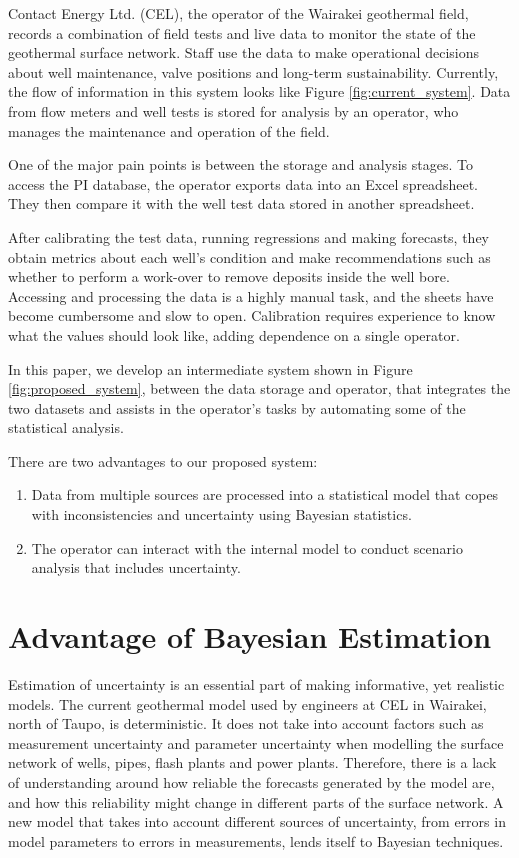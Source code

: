 \documentclass[a4paper, 12pt]{article}
\begin{document}
Contact Energy Ltd. (CEL), the operator of the Wairakei geothermal field, records a combination of field tests and live data to monitor the state of the geothermal surface network. Staff use the data to make operational decisions about well maintenance, valve positions and long-term sustainability. Currently, the flow of information in this system looks like Figure \ref{fig:current_system}. Data from flow meters and well tests is stored for analysis by an operator, who manages the maintenance and operation of the field. 

One of the major pain points is between the storage and analysis stages. To access the PI database, the operator exports data into an Excel spreadsheet. They then compare it with the well test data stored in another spreadsheet.

After calibrating the test data, running regressions and making forecasts, they obtain metrics about each well's condition and make recommendations such as whether to perform a work-over to remove deposits inside the well bore. Accessing and processing the data is a highly manual task, and the sheets have become cumbersome and slow to open. Calibration requires experience to know what the values should look like, adding dependence on a single operator.

In this paper, we develop an intermediate system shown in Figure \ref{fig:proposed_system}, between the data storage and operator, that integrates the two datasets and assists in the operator's tasks by automating some of the statistical analysis.

There are two advantages to our proposed system:
\begin{enumerate}
\item Data from multiple sources are processed into a statistical model that copes with inconsistencies and uncertainty using Bayesian statistics.
\item The operator can interact with the internal model to conduct scenario analysis that includes uncertainty.
\end{enumerate}

\section{Advantage of Bayesian Estimation}
Estimation of uncertainty is an essential part of making informative, yet realistic models. The current geothermal model used by engineers at CEL in Wairakei, north of Taupo, is deterministic. It does not take into account factors such as measurement uncertainty and parameter uncertainty when modelling the surface network of wells, pipes, flash plants and power plants. Therefore, there is a lack of understanding around how reliable the forecasts generated by the model are, and how this reliability might change in different parts of the surface network.
A new model that takes into account different sources of uncertainty, from errors in model parameters to errors in measurements, lends itself to Bayesian techniques. 
\end{document}
